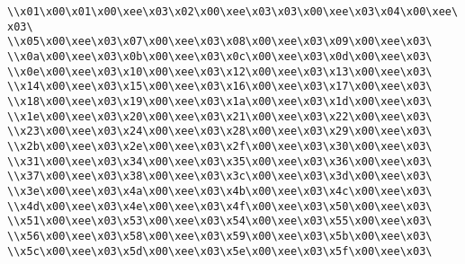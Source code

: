 \verb|\\x01\x00\x01\x00\xee\x03\x02\x00\xee\x03\x03\x00\xee\x03\x04\x00\xee\x03\|\newline
\verb|\\x05\x00\xee\x03\x07\x00\xee\x03\x08\x00\xee\x03\x09\x00\xee\x03\|\newline
\verb|\\x0a\x00\xee\x03\x0b\x00\xee\x03\x0c\x00\xee\x03\x0d\x00\xee\x03\|\newline
\verb|\\x0e\x00\xee\x03\x10\x00\xee\x03\x12\x00\xee\x03\x13\x00\xee\x03\|\newline
\verb|\\x14\x00\xee\x03\x15\x00\xee\x03\x16\x00\xee\x03\x17\x00\xee\x03\|\newline
\verb|\\x18\x00\xee\x03\x19\x00\xee\x03\x1a\x00\xee\x03\x1d\x00\xee\x03\|\newline
\verb|\\x1e\x00\xee\x03\x20\x00\xee\x03\x21\x00\xee\x03\x22\x00\xee\x03\|\newline
\verb|\\x23\x00\xee\x03\x24\x00\xee\x03\x28\x00\xee\x03\x29\x00\xee\x03\|\newline
\verb|\\x2b\x00\xee\x03\x2e\x00\xee\x03\x2f\x00\xee\x03\x30\x00\xee\x03\|\newline
\verb|\\x31\x00\xee\x03\x34\x00\xee\x03\x35\x00\xee\x03\x36\x00\xee\x03\|\newline
\verb|\\x37\x00\xee\x03\x38\x00\xee\x03\x3c\x00\xee\x03\x3d\x00\xee\x03\|\newline
\verb|\\x3e\x00\xee\x03\x4a\x00\xee\x03\x4b\x00\xee\x03\x4c\x00\xee\x03\|\newline
\verb|\\x4d\x00\xee\x03\x4e\x00\xee\x03\x4f\x00\xee\x03\x50\x00\xee\x03\|\newline
\verb|\\x51\x00\xee\x03\x53\x00\xee\x03\x54\x00\xee\x03\x55\x00\xee\x03\|\newline
\verb|\\x56\x00\xee\x03\x58\x00\xee\x03\x59\x00\xee\x03\x5b\x00\xee\x03\|\newline
\verb|\\x5c\x00\xee\x03\x5d\x00\xee\x03\x5e\x00\xee\x03\x5f\x00\xee\x03\|\newline
